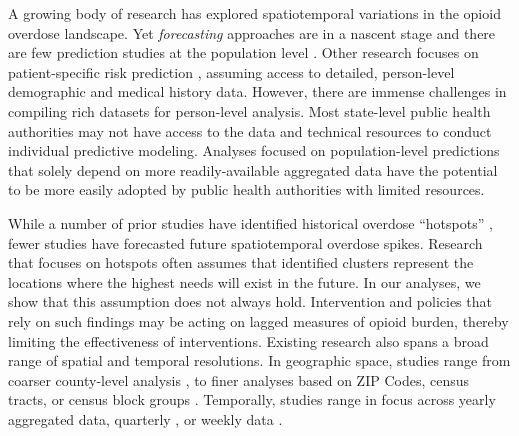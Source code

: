 A growing body of research \citep{marksMethodologicalApproachesPrediction2021} has explored spatiotemporal variations in the opioid overdose landscape. Yet \emph{forecasting} approaches are in a nascent stage and there are few prediction studies at the population level \citep{borquezFatalOverdosePredicting2022}. Other research focuses on patient-specific risk prediction \citep{tseregounisAssessingOpioidOverdose2021,lo-ciganicIntegratingHumanServices2021,lo-ciganicDevelopingValidatingMachinelearning2022}, assuming access to detailed, person-level demographic and medical history data. However, there are immense challenges in compiling rich datasets for person-level analysis. Most state-level public health authorities may not have access to the data and technical resources to conduct individual predictive modeling. Analyses focused on population-level predictions that solely depend on more readily-available aggregated data have the potential to be more easily adopted by public health authorities with limited resources.

While a number of prior studies have identified historical overdose ``hotspots'' \citep{acharyaExploringCountylevelSpatiotemporal2022,herlandsGaussianProcessSubset2018,luGeographicTemporalTrends2023}, fewer studies have forecasted future spatiotemporal overdose spikes. Research that focuses on hotspots often assumes that identified clusters represent the locations where the highest needs will exist in the future. In our analyses, we show that this assumption does not always hold. Intervention and policies that rely on such findings may be acting on lagged measures of opioid burden, thereby limiting the effectiveness of interventions. Existing research also spans a broad range of spatial and temporal resolutions. In geographic space, studies range from coarser county-level analysis \citep{acharyaExploringCountylevelSpatiotemporal2022}, to finer analyses based on ZIP Codes, census tracts, or census block groups \citep{allenTranslatingPredictiveAnalytics2023}. 
Temporally, studies range in focus across yearly aggregated \citep{acharyaExploringCountylevelSpatiotemporal2022} data, quarterly \citep{heutonZIGP2022}
, or weekly data \citep{ertugrulCASTNetCommunityAttentiveSpatioTemporal2019}.

